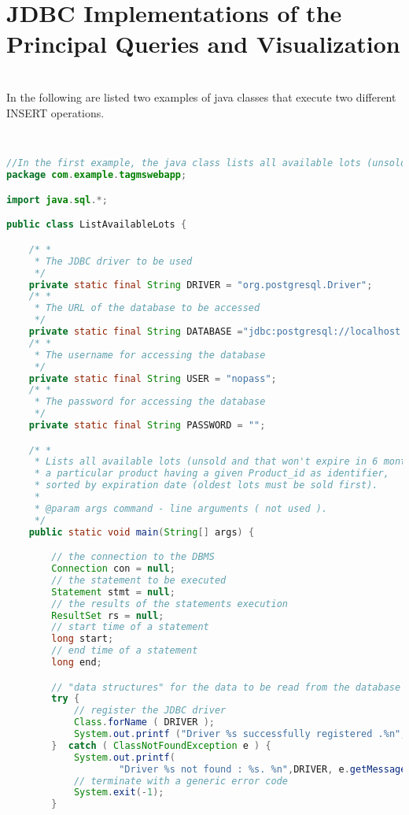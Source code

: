 \section{JDBC Implementations of the Principal Queries and Visualization}
\\
In the following are listed two examples of java classes that execute two different INSERT operations.



\begin{lstlisting}[language=JAVA,
commentstyle = \color{gray},
keywordstyle = \color{blue}, 
stringstyle = \color{ForestGreen}, 
rulecolor = \color{black},
breaklines=true,
basicstyle=\ttfamily\footnotesize,
showstringspaces=false]


//In the first example, the java class lists all available lots (unsold and that won't expire in 6 months) containing a particular product having a given Product_id as identifier, sorted by expiration date (oldest lots must be sold first).
package com.example.tagmswebapp;

import java.sql.*;

public class ListAvailableLots {

    /* *
     * The JDBC driver to be used
     */
    private static final String DRIVER = "org.postgresql.Driver";
    /* *
     * The URL of the database to be accessed
     */
    private static final String DATABASE ="jdbc:postgresql://localhost:5432/tagmsdb";
    /* *
     * The username for accessing the database
     */
    private static final String USER = "nopass";
    /* *
     * The password for accessing the database
     */
    private static final String PASSWORD = "";

    /* *
     * Lists all available lots (unsold and that won't expire in 6 months) containing
     * a particular product having a given Product_id as identifier,
     * sorted by expiration date (oldest lots must be sold first).
     *
     * @param args command - line arguments ( not used ).
     */
    public static void main(String[] args) {

        // the connection to the DBMS
        Connection con = null;
        // the statement to be executed
        Statement stmt = null;
        // the results of the statements execution
        ResultSet rs = null;
        // start time of a statement
        long start;
        // end time of a statement
        long end;

        // "data structures" for the data to be read from the database
        try {
            // register the JDBC driver
            Class.forName ( DRIVER );
            System.out.printf ("Driver %s successfully registered .%n", DRIVER );
        }  catch ( ClassNotFoundException e ) {
            System.out.printf(
                    "Driver %s not found : %s. %n",DRIVER, e.getMessage());
            // terminate with a generic error code
            System.exit(-1);
        }


\end{lstlisting}
